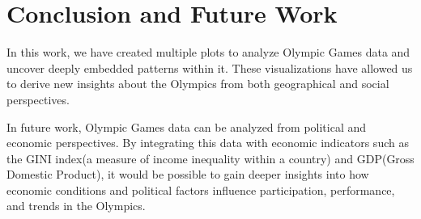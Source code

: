 \chapter{Conclusion and Future Work} \label{chap:conclusion}

In this work, we have created multiple plots to analyze Olympic Games data and uncover deeply embedded patterns within it. These visualizations have allowed us to derive new insights about the Olympics from both geographical and social perspectives.

In future work, Olympic Games data can be analyzed from political and economic perspectives. By integrating this data with economic indicators such as the GINI index(a measure of income inequality within a country) and GDP(Gross Domestic Product), it would be possible to gain deeper insights into how economic conditions and political factors influence participation, performance, and trends in the Olympics.
